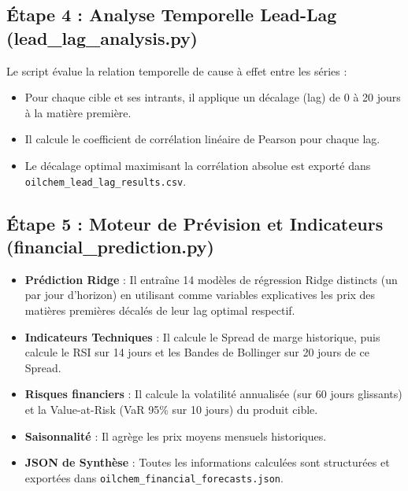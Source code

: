 \documentclass[12pt,a4paper]{article}
\begin{document}
\subsection{Étape 4 : Analyse Temporelle Lead-Lag (lead\_lag\_analysis.py)}
Le script évalue la relation temporelle de cause à effet entre les séries :
\begin{itemize}
    \item Pour chaque cible et ses intrants, il applique un décalage (lag) de 0 à 20 jours à la matière première.
    \item Il calcule le coefficient de corrélation linéaire de Pearson pour chaque lag.
    \item Le décalage optimal maximisant la corrélation absolue est exporté dans \texttt{oilchem\_lead\_lag\_results.csv}.
\end{itemize}

\subsection{Étape 5 : Moteur de Prévision et Indicateurs (financial\_prediction.py)}
\begin{itemize}
    \item \textbf{Prédiction Ridge} : Il entraîne 14 modèles de régression Ridge distincts (un par jour d'horizon) en utilisant comme variables explicatives les prix des matières premières décalés de leur lag optimal respectif.
    \item \textbf{Indicateurs Techniques} : Il calcule le Spread de marge historique, puis calcule le RSI sur 14 jours et les Bandes de Bollinger sur 20 jours de ce Spread.
    \item \textbf{Risques financiers} : Il calcule la volatilité annualisée (sur 60 jours glissants) et la Value-at-Risk (VaR 95\% sur 10 jours) du produit cible.
    \item \textbf{Saisonnalité} : Il agrège les prix moyens mensuels historiques.
    \item \textbf{JSON de Synthèse} : Toutes les informations calculées sont structurées et exportées dans \texttt{oilchem\_financial\_forecasts.json}.
\end{itemize}
\end{document}
